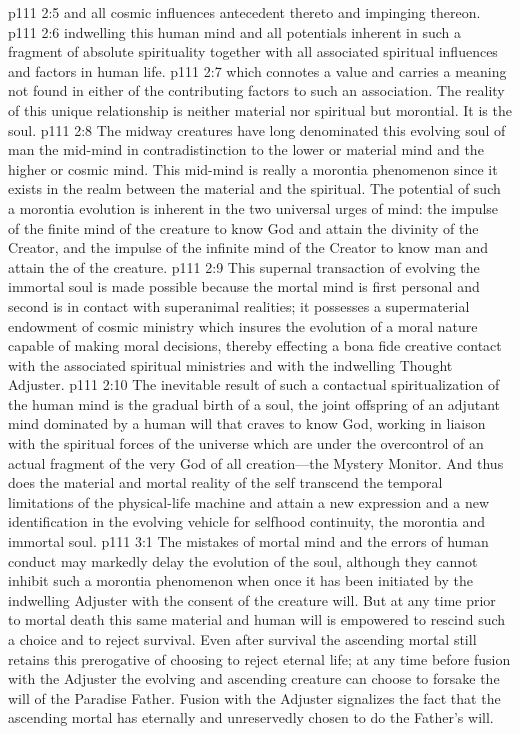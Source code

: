 \pc \vs p111 2:5 \bibnobreakspace {} and all cosmic influences antecedent thereto and impinging thereon.
\pc \vs p111 2:6 \bibnobreakspace {} indwelling this human mind and all potentials inherent in such a fragment of absolute spirituality together with all associated spiritual influences and factors in human life.
\pc \vs p111 2:7 \bibnobreakspace {} which connotes a value and carries a meaning not found in either of the contributing factors to such an association. The reality of this unique relationship is neither material nor spiritual but morontial. It is the soul.
\pc \vs p111 2:8 The midway creatures have long denominated this evolving soul of man the mid\hyp{}mind in contradistinction to the lower or material mind and the higher or cosmic mind. This mid\hyp{}mind is really a morontia phenomenon since it exists in the realm between the material and the spiritual. The potential of such a morontia evolution is inherent in the two universal urges of mind: the impulse of the finite mind of the creature to know God and attain the divinity of the Creator, and the impulse of the infinite mind of the Creator to know man and attain the  of the creature.
\vs p111 2:9 This supernal transaction of evolving the immortal soul is made possible because the mortal mind is first personal and second is in contact with superanimal realities; it possesses a supermaterial endowment of cosmic ministry which insures the evolution of a moral nature capable of making moral decisions, thereby effecting a bona fide creative contact with the associated spiritual ministries and with the indwelling Thought Adjuster.
\vs p111 2:10 The inevitable result of such a contactual spiritualization of the human mind is the gradual birth of a soul, the joint offspring of an adjutant mind dominated by a human will that craves to know God, working in liaison with the spiritual forces of the universe which are under the overcontrol of an actual fragment of the very God of all creation---the Mystery Monitor. And thus does the material and mortal reality of the self transcend the temporal limitations of the physical\hyp{}life machine and attain a new expression and a new identification in the evolving vehicle for selfhood continuity, the morontia and immortal soul.
\vs p111 3:1 The mistakes of mortal mind and the errors of human conduct may markedly delay the evolution of the soul, although they cannot inhibit such a morontia phenomenon when once it has been initiated by the indwelling Adjuster with the consent of the creature will. But at any time prior to mortal death this same material and human will is empowered to rescind such a choice and to reject survival. Even after survival the ascending mortal still retains this prerogative of choosing to reject eternal life; at any time before fusion with the Adjuster the evolving and ascending creature can choose to forsake the will of the Paradise Father. Fusion with the Adjuster signalizes the fact that the ascending mortal has eternally and unreservedly chosen to do the Father’s will.
